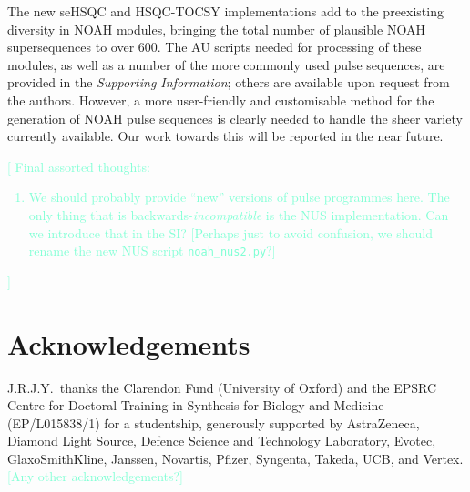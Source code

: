 \documentclass[draft,11pt]{article}
\newcommand*{\hl}[1]{\textcolor{Aquamarine}{[#1]}}
\newcommand*{\SInf}{\textit{Supporting Information}}
\begin{document}
The new seHSQC and HSQC-TOCSY implementations add to the preexisting diversity in NOAH modules, bringing the total number of plausible NOAH supersequences to over 600.
The AU scripts needed for processing of these modules, as well as a number of the more commonly used pulse sequences, are provided in the \SInf{}; others are available upon request from the authors.
However, a more user-friendly and customisable method for the generation of NOAH pulse sequences is clearly needed to handle the sheer variety currently available.
Our work towards this will be reported in the near future.

\hl{
    Final assorted thoughts:
    \begin{enumerate}
        \item We should probably provide ``new'' versions of pulse programmes here. The only thing that is backwards-\textit{incompatible} is the NUS implementation. Can we introduce that in the SI? [Perhaps just to avoid confusion, we should rename the new NUS script \texttt{noah\_nus2.py}?]
    \end{enumerate}
}


\section*{Acknowledgements}

J.R.J.Y.\ thanks the Clarendon Fund (University of Oxford) and the EPSRC Centre for Doctoral Training in Synthesis for Biology and Medicine (EP/L015838/1) for a studentship, generously supported by AstraZeneca, Diamond Light Source, Defence Science and Technology Laboratory, Evotec, GlaxoSmithKline, Janssen, Novartis, Pfizer, Syngenta, Takeda, UCB, and Vertex.
\hl{Any other acknowledgements?}

\printbibliography


\end{document}
